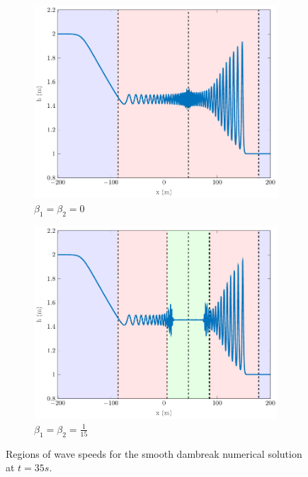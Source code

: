 \documentclass[10pt]{elsarticle}
\begin{document}
\begin{figure}
	\centering
	\begin{subfigure}{0.49\textwidth}
		\centering
		\includegraphics[width=\textwidth]{./Figures/Simulations/Study/ImpDisp/Regions/hRegionsSerre.pdf}
		\caption{$\beta_1 = \beta_2 = 0$}
	\end{subfigure}
	\begin{subfigure}{0.49\textwidth}
		\centering
		\includegraphics[width=\textwidth]{./Figures/Simulations/Study/ImpDisp/Regions/hRegionsImpDisp.pdf}
		\caption{$\beta_1 = \beta_2 = \frac{1}{15}$}
	\end{subfigure}
	\caption{Regions of wave speeds for the smooth dambreak numerical solution at $t=35s$.}
\end{figure}
\end{document}
